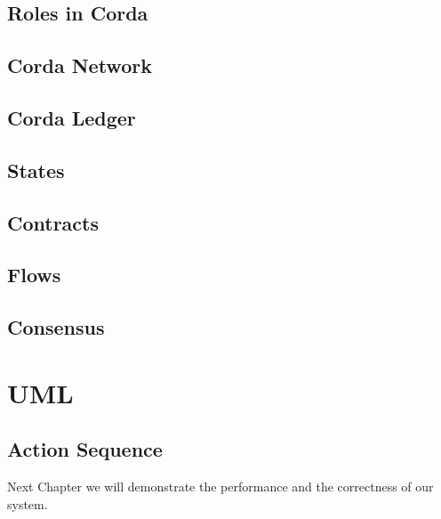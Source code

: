 \subsection{Roles in Corda}


\subsection{Corda Network}

	
\subsection{Corda Ledger}

\subsection{States}

\subsection{Contracts}

\subsection{Flows}

\subsection{Consensus}

\section{UML}
\subsection{Action Sequence}


Next Chapter we will demonstrate the performance and the correctness of our system.